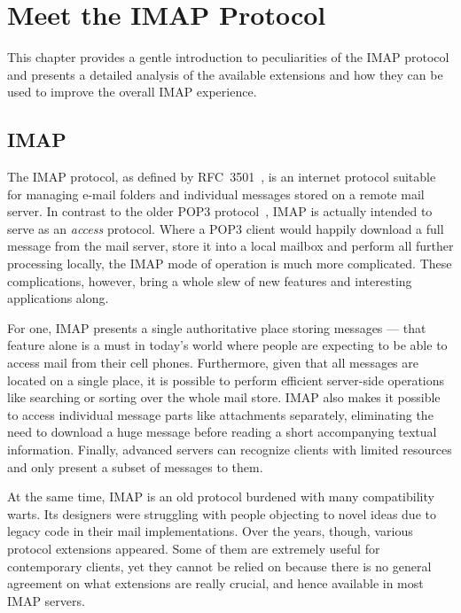\documentclass[trojita]{subfiles}
\begin{document}
\chapter{Meet the IMAP Protocol}
\label{sec:imap-protocol}

This chapter provides a gentle introduction to peculiarities of the IMAP protocol and presents a detailed analysis of
the available extensions and how they can be used to improve the overall IMAP experience.

\section{IMAP}

The IMAP protocol, as defined by RFC~3501~\cite{rfc3501}, is an internet protocol suitable for managing e-mail folders
and individual messages stored on a remote mail server.  In contrast to the older POP3 protocol~\cite{rfc1939}, IMAP is
actually intended to serve as an {\em access} protocol.  Where a POP3 client would happily download a full message from
the mail server, store it into a local mailbox and perform all further processing locally, the IMAP mode of operation is
much more complicated.  These complications, however, bring a whole slew of new features and interesting applications
along.

For one, IMAP presents a single authoritative place storing messages --- that feature alone is a must in today's world
where people are expecting to be able to access mail from their cell phones.  Furthermore, given that all messages
are located on a single place, it is possible to perform efficient server-side operations like searching or sorting over
the whole mail store.  IMAP also makes it possible to access individual message parts like attachments separately,
eliminating the need to download a huge message before reading a short accompanying textual information.  Finally,
advanced servers can recognize clients with limited resources and only present a subset of messages to them.

At the same time, IMAP is an old protocol burdened with many compatibility warts.  Its designers were struggling with
people objecting to novel ideas due to legacy code in their mail implementations.  Over the years, though, various
protocol extensions appeared.  Some of them are extremely useful for contemporary clients, yet they cannot be relied on
because there is no general agreement on what extensions are really crucial, and hence available in most IMAP servers.
\end{document}
